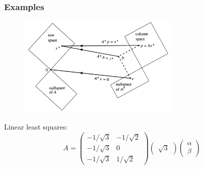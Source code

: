 \documentclass[xcolor={dvipsnames}]{beamer}
\begin{document}
\begin{frame}
\frametitle{Examples}
\begin{figure}
\includegraphics[width=3in]{figs/Strang1993nov-fig4.png}
\end{figure}
Linear least squares:
\begin{equation}
A = \begin{pmatrix}
-1/\sqrt{3} & -1/\sqrt{2} \\
-1/\sqrt{3} & 0 \\
-1/\sqrt{3} & 1/\sqrt{2}
\end{pmatrix}
\begin{pmatrix}
    \sqrt{3}
\end{pmatrix}
\begin{pmatrix}
\alpha \\
\beta
\end{pmatrix}
\end{equation}
\end{frame}




% 

% 
\end{document}
